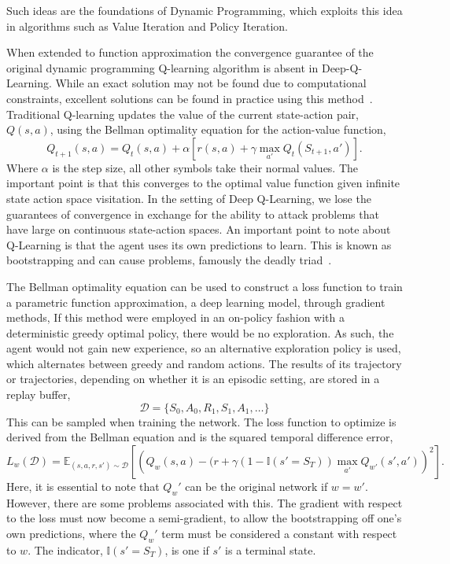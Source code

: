 Such ideas are the foundations of Dynamic Programming, which exploits this idea in algorithms such as Value Iteration\cite{bellamn1957mdp} and Policy Iteration\cite{howard1960dynamic}.

When extended to function approximation the convergence guarantee of the original dynamic programming Q-learning algorithm is absent in Deep-Q-Learning. While an exact solution may not be found due to computational constraints, excellent solutions can be found in practice using this method~\cite{mnih2013playing}. Traditional Q-learning updates the value of the current state-action pair, $Q(s, a)$, using the Bellman optimality equation for the action-value function,
\begin{equation}
	Q_{t+1}(s, a) = Q_t(s,a) + \alpha \left[ r(s, a) + \gamma \max_{a'} Q_t(S_{t+1}, a') \right].
\end{equation}
Where $\alpha$ is the step size, all other symbols take their normal values. The important point is that this converges to the optimal value function given infinite state action space visitation. In the setting of Deep Q-Learning, we lose the guarantees of convergence in exchange for the ability to attack problems that have large on continuous state-action spaces. An important point to note about Q-Learning is that the agent uses its own predictions to learn. This is known as bootstrapping and can cause problems, famously the deadly triad~\cite{van2018deep,sutton2018reinforcement}.

The Bellman optimality equation can be used to construct a loss function to train a parametric function approximation, a deep learning model, through gradient methods, If this method were employed in an on-policy fashion with a deterministic greedy optimal policy, there would be no exploration. As such, the agent would not gain new experience, so an alternative exploration policy is used, which alternates between greedy and random actions. The results of its trajectory or trajectories, depending on whether it is an episodic setting, are stored in a replay buffer,
\begin{equation}
	\mathcal{D} = \{S_0, A_0, R_1, S_1, A_1, \ldots \}
\end{equation}
This can be sampled when training the network. The loss function to optimize is derived from the Bellman equation and is the squared temporal difference error\cite{sutton2018reinforcement},
\begin{equation}
	L_{w}(\mathcal{D}) = \mathbb{E}_{(s,a,r,s') \sim \mathcal{D}}\left[\left(Q_w(s,a) -(r + \gamma(1-\mathbb{I}(s'= S_{T}))\max_{a'}Q_{w'}(s', a')\right)^2\right].
\end{equation}
Here, it is essential to note that $Q_w'$ can be the original network if $w = w'$. However, there are some problems associated with this. The gradient with respect to the loss must now become a semi-gradient, to allow the bootstrapping off one's own predictions, where the $Q_w'$ term must be considered a constant with respect to $w$. The indicator, $\mathbb{I}(s' = S_T)$,  is one if $s'$ is a terminal state.

